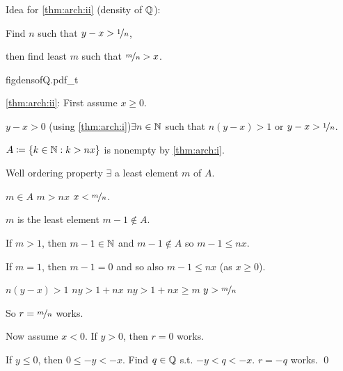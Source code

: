 \documentclass[10pt,aspectratio=149]{beamer}
\begin{document}
\begin{frame}
Idea for \eqref{thm:arch:ii} (density of ${\mathbb{Q}}$):

\medskip

Find $n$ such that $y-x > \nicefrac{1}{n}$,

\medskip

then find least $m$ such that $\nicefrac{m}{n} > x$.

\vspace*{-0.5in}
\hspace*{2.0in}%
{figdensofQ.pdf_t}

\vspace*{-0.3in}
\pause

\eqref{thm:arch:ii}:
First assume $x \geq 0$.

\medskip
\pause

$y-x > 0$ \quad (using \eqref{thm:arch:i})\thus \quad $\exists n \in {\mathbb{N}}$ such that
\quad
$n(y-x) > 1$
\quad or \quad
$y-x > \nicefrac{1}{n}$.

\medskip
\pause

$A \coloneqq \{ k \in {\mathbb{N}} : k > nx \}$ is nonempty by \eqref{thm:arch:i}.

\medskip
\pause

Well ordering property \wthus $\exists$ a least element $m$ of $A$.

\medskip
\pause

$m \in A$ \wthus $m > nx$ \wthus $x < \nicefrac{m}{n}$.

\medskip
\pause

$m$ is the least element \wthus $m-1 \notin A$.

\medskip
\pause

If $m > 1$, then $m-1 \in {\mathbb{N}}$ and $m-1 \notin A$ so \quad $m-1 \leq nx$.

\pause

If $m = 1$, then $m-1 = 0$ and so also \quad $m-1 \leq nx$ \quad (as $x \geq 0$).

%

\medskip
\pause

$n(y-x) > 1$ \wthus $ny > 1+nx$
\pause
\wthus
$ny > 1+nx \geq m$
\pause
\wthus
$y > \nicefrac{m}{n}$
\pause

So $r=\nicefrac{m}{n}$ works.

\medskip
\pause

Now assume $x < 0$.  \qquad\pause  If $y > 0$, then $r=0$ works.

\medskip
\pause

If $y \leq 0$, then $0 \leq -y < -x$.
\quad \pause
Find $q\in {\mathbb{Q}}$ s.t. $-y < q < -x$.
\quad \pause  $r = -q$ works.
\qed

\end{frame}
\end{document}
